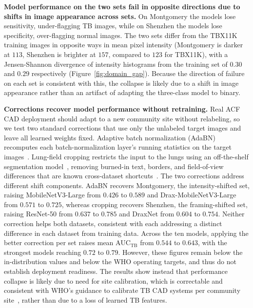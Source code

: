 \documentclass[conference, letterpaper]{IEEEtran}
\begin{document}
\textbf{Model performance on the two sets fail in opposite directions due to shifts in image appearance across sets.}
On Montgomery the models lose sensitivity, under-flagging TB images, while on Shenzhen the models lose specificity, over-flagging normal images. The two sets differ from the TBX11K training images in opposite ways in mean pixel intensity (Montgomery is darker at $113$, Shenzhen is brighter at $157$, compared to $123$ for TBX11K), with a Jensen-Shannon divergence of intensity histograms from the training set of $0.30$ and $0.29$ respectively (Figure~\ref{fig:domain_gap}). Because the direction of failure on each set is consistent with this, the collapse is likely due to a shift in image appearance rather than an artifact of adapting the three-class model to binary.

\textbf{Corrections recover model performance without retraining.}
Real ACF CAD deployment should adapt to a new community site without relabeling, so we test two standard corrections that use only the unlabeled target images and leave all learned weights fixed. Adaptive batch normalization (AdaBN) recomputes each batch-normalization layer's running statistics on the target images~\cite{li2018adabn}. Lung-field cropping restricts the input to the lungs using an off-the-shelf segmentation model~\cite{cohen2022torchxrayvision}, removing burned-in text, borders, and field-of-view differences that are known cross-dataset shortcuts~\cite{zech2018shortcut}. The two corrections address different shift components. AdaBN recovers Montgomery, the intensity-shifted set, raising MobileNetV3-Large from $0.426$ to $0.589$ and Drax-MobileNetV3-Large from $0.571$ to $0.725$, whereas cropping recovers Shenzhen, the framing-shifted set, raising ResNet-50 from $0.637$ to $0.785$ and DraxNet from $0.604$ to $0.754$. Neither correction helps both datasets, consistent with each addressing a distinct difference in each dataset from training data. Across the ten models, applying the better correction per set raises mean AUC$_{\text{TB}}$ from $0.544$ to $0.643$, with the strongest models reaching $0.72$ to $0.79$. However, these figures remain below the in-distribution values and below the WHO operating targets, and thus do not establish deployment readiness. The results show instead that performance collapse is likely due to need for site calibration, which is correctable and consistent with WHO's guidance to calibrate TB CAD systems per community site~\cite{who_cad_approval_2025}, rather than due to a loss of learned TB features.
\end{document}
